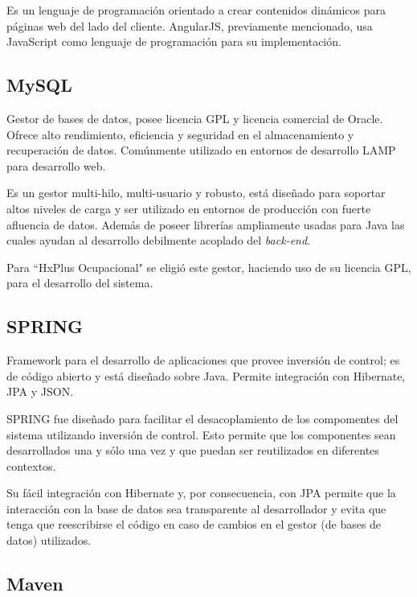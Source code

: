         Es un lenguaje de programación orientado a crear contenidos dinámicos para páginas web del lado del cliente. AngularJS, previamente mencionado, usa JavaScript como lenguaje de programación para su implementación.
        
        \subsection{MySQL}
        \label{tecno-mysql}
        
        Gestor de bases de datos, posee licencia GPL y licencia comercial de Oracle\cite{MYSQL-referencemanual}. Ofrece alto rendimiento, eficiencia y seguridad en el almacenamiento y recuperación de datos\cite{MYSQL-oracle}. Comúnmente utilizado en entornos de desarrollo LAMP para desarrollo web.
        
        Es un gestor multi-hilo, multi-usuario y robusto, está diseñado para soportar altos niveles de carga y ser utilizado en entornos de producción con fuerte afluencia de datos. Además de poseer librerías ampliamente usadas para Java las cuales ayudan al desarrollo debilmente acoplado del \textit{back-end}.
        
        Para ``HxPlus Ocupacional" se eligió este gestor, haciendo uso de su licencia GPL, para el desarrollo del sistema.
        
        \subsection{SPRING}
        \label{tecno-spring}
        
        Framework para el desarrollo de aplicaciones que provee inversión de control; es de código abierto y está diseñado sobre Java. Permite integración con Hibernate, JPA y JSON\cite{SPRING-essential}.
        
        SPRING fue diseñado para facilitar el desacoplamiento de los compomentes del sistema utilizando inversión de control. Esto permite que los componentes sean desarrollados una y sólo una vez y que puedan ser reutilizados en diferentes contextos\cite{SPRING-referencedoc}.
        
        Su fácil integración con Hibernate y, por consecuencia, con JPA permite que la interacción con la base de datos sea transparente al desarrollador y evita que tenga que reescribirse el código en caso de cambios en el gestor (de bases de datos) utilizados.
        
        
        \subsection{Maven}
        \label{tecno-maven}
        
